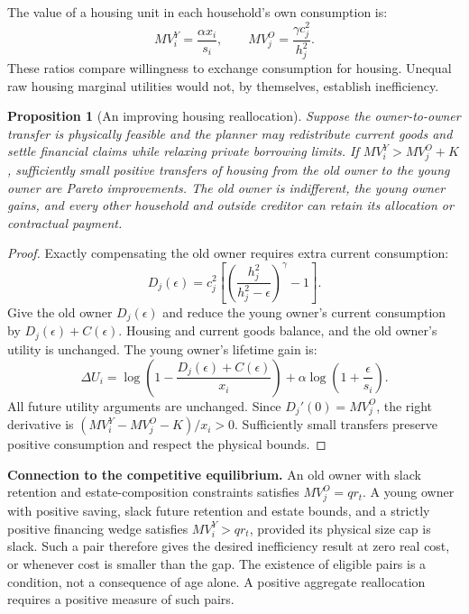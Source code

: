 \documentclass[11pt]{article}
\newtheorem{proposition}{Proposition}
\begin{document}
The value of a housing unit in each household's own consumption is:
\begin{equation}
 MV_i^Y=\frac{\alpha x_i}{s_i},\qquad
 MV_j^O=\frac{\gamma c_j^2}{h_j^2}.
\end{equation}
These ratios compare willingness to exchange consumption for housing. Unequal
raw housing marginal utilities would not, by themselves, establish inefficiency.

\begin{proposition}[An improving housing reallocation]
Suppose the owner-to-owner transfer is physically feasible and the planner may
redistribute current goods and settle financial claims while relaxing private
borrowing limits. If $MV_i^Y>MV_j^O+K$, sufficiently small positive transfers of
housing from the old owner to the young owner are Pareto improvements. The old
owner is indifferent, the young owner gains, and every other household and
outside creditor can retain its allocation or contractual payment.
\end{proposition}

\begin{proof}
Exactly compensating the old owner requires extra current consumption:
\begin{equation}
 D_j(\epsilon)=c_j^2\left[
 \left(\frac{h_j^2}{h_j^2-\epsilon}\right)^\gamma-1\right].
\end{equation}
Give the old owner $D_j(\epsilon)$ and reduce the young owner's current
consumption by $D_j(\epsilon)+C(\epsilon)$. Housing and current goods balance,
and the old owner's utility is unchanged. The young owner's lifetime gain is:
\begin{equation}
 \Delta U_i=\log\left(1-\frac{D_j(\epsilon)+C(\epsilon)}{x_i}\right)
 +\alpha\log\left(1+\frac{\epsilon}{s_i}\right).
\end{equation}
All future utility arguments are unchanged. Since $D_j'(0)=MV_j^O$, the right
derivative is $(MV_i^Y-MV_j^O-K)/x_i>0$. Sufficiently small transfers preserve
positive consumption and respect the physical bounds.
\end{proof}

\textbf{Connection to the competitive equilibrium.} An old owner with slack
retention and estate-composition constraints satisfies $MV_j^O=q r_t$. A young
owner with positive saving, slack future retention and estate bounds, and a
strictly positive financing wedge satisfies $MV_i^Y>q r_t$, provided its physical
size cap is slack. Such a pair therefore gives the desired inefficiency result
at zero real cost, or whenever cost is smaller than the gap. The existence of
eligible pairs is a condition, not a consequence of age alone. A positive
aggregate reallocation requires a positive measure of such pairs.
\end{document}
